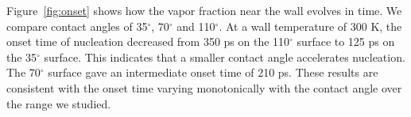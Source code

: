 Figure~\ref{fig:onset} shows how the vapor fraction near the wall evolves in time. We compare contact angles of 35$^\circ$, 70$^\circ$ and 110$^\circ$. At a wall temperature of 300 K, the onset time of nucleation decreased from 350 ps on the 110$^\circ$ surface to 125 ps on the 35$^\circ$ surface. This indicates that a smaller contact angle accelerates nucleation. The 70$^\circ$ surface gave an intermediate onset time of 210 ps. These results are consistent with the onset time varying monotonically with the contact angle over the range we studied.